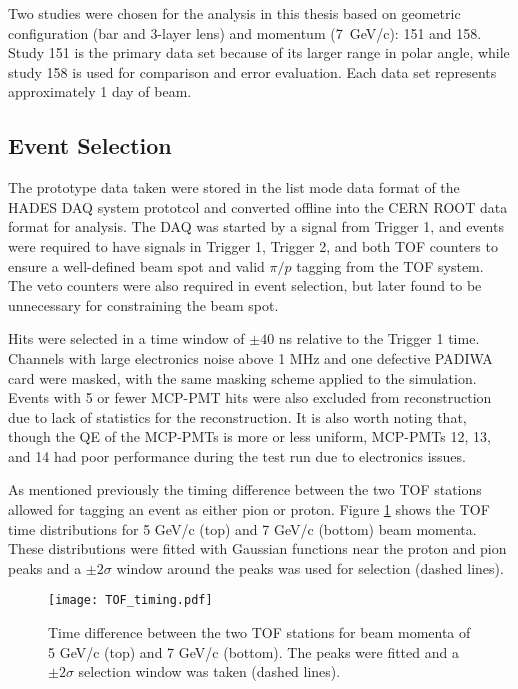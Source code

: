 Two studies were chosen for the analysis in this thesis based on geometric configuration (bar and 3-layer lens) and momentum (7~GeV/c): 151 and 158. Study 151 is the primary data set because of its larger range in polar angle, while study 158 is used for comparison and error evaluation. Each data set represents approximately 1 day of beam.

\subsection{Event Selection}
The prototype data taken were stored in the list mode data format of the HADES DAQ system prototcol \cite{HADES_DAQ} and converted offline into the CERN ROOT data format \cite{ROOT} for analysis. The DAQ was started by a signal from Trigger 1, and events were required to have signals in Trigger 1, Trigger 2, and both TOF counters to ensure a well-defined beam spot and valid $\pi/p$ tagging from the TOF system. The veto counters were also required in event selection, but later found to be unnecessary for constraining the beam spot.

Hits were selected in a time window of $\pm 40$ ns relative to the Trigger 1 time. Channels with large electronics noise above 1 MHz and one defective PADIWA card were masked, with the same masking scheme applied to the simulation. Events with 5 or fewer MCP-PMT hits were also excluded from reconstruction due to lack of statistics for the reconstruction. It is also worth noting that, though the QE of the MCP-PMTs is more or less uniform, MCP-PMTs 12, 13, and 14 had poor performance during the test run due to electronics issues.

As mentioned previously the timing difference between the two TOF stations allowed for tagging an event as either pion or proton. Figure \ref{fig:tof_timing} shows the TOF time distributions for 5 GeV/c (top) and 7 GeV/c (bottom) beam momenta. These distributions were fitted with Gaussian functions near the proton and pion peaks and a $\pm2\sigma$ window around the peaks was used for selection (dashed lines).

\begin{figure}[!htb]
	\centering
	\texttt{[image: TOF\_timing.pdf]}
	\caption{Time difference between the two TOF stations for beam momenta of 5 GeV/c (top) and 7 GeV/c (bottom). The peaks were fitted and a $\pm2\sigma$ selection window was taken (dashed lines).}
	\label{fig:tof_timing}
\end{figure}

